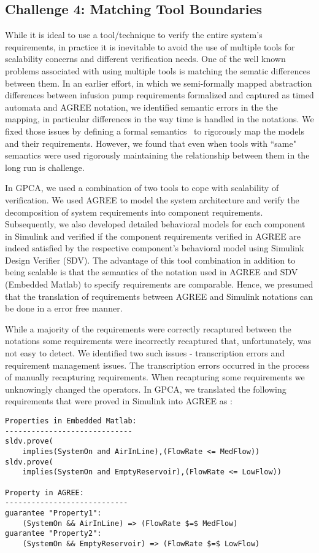 \subsection{Challenge 4: Matching Tool Boundaries}

While it is ideal to use a tool/technique to verify the entire system's requirements, in practice it is inevitable to avoid the use of multiple tools for scalability concerns and different verification needs. One of the well known problems associated with using multiple tools is matching the sematic differences between them. In an earlier effort, in which we semi-formally mapped abstraction differences between infusion pump requirements formalized and captured as timed automata and AGREE notation, we identified semantic errors in the the mapping, in particular differences in the way time is handled in the notations. We fixed those issues by defining a formal semantics~\cite{whalen2015hierarchical} to rigorously map the models and their requirements. However, we found that even when tools with ``same" semantics were used rigorously maintaining the relationship between them in the long run is challenge.

In GPCA, we used a combination of two tools to cope with scalability of verification. We used AGREE to model the system architecture and verify the decomposition of system requirements into component requirements. Subsequently, we also developed detailed behavioral models for each component in Simulink and verified if the component requirements verified in AGREE are indeed satisfied by the respective component's behavioral model using Simulink Design Verifier (SDV). The advantage of this tool combination in addition to being scalable is that the semantics of the notation used in AGREE and SDV (Embedded Matlab) to specify requirements are comparable. Hence, we presumed that the translation of requirements between AGREE and Simulink notations can be done in a error free manner.

While a majority of the requirements were correctly recaptured between the notations some requirements were incorrectly recaptured that, unfortunately, was not easy to detect. We identified two such issues - transcription errors and requirement management issues. The transcription errors occurred in the process of manually recapturing requirements. When recapturing some requirements we unknowingly changed the operators. In GPCA, we translated the following requirements that were proved in Simulink into AGREE as :

\scriptsize{
\begin{verbatim}
Properties in Embedded Matlab:
-----------------------------
sldv.prove(
    implies(SystemOn and AirInLine),(FlowRate <= MedFlow))
sldv.prove(
    implies(SystemOn and EmptyReservoir),(FlowRate <= LowFlow))

Property in AGREE:
----------------------------
guarantee "Property1":
    (SystemOn && AirInLine) => (FlowRate $=$ MedFlow)
guarantee "Property2":
    (SystemOn && EmptyReservoir) => (FlowRate $=$ LowFlow)
\end{verbatim}
}
\normalsize{}

